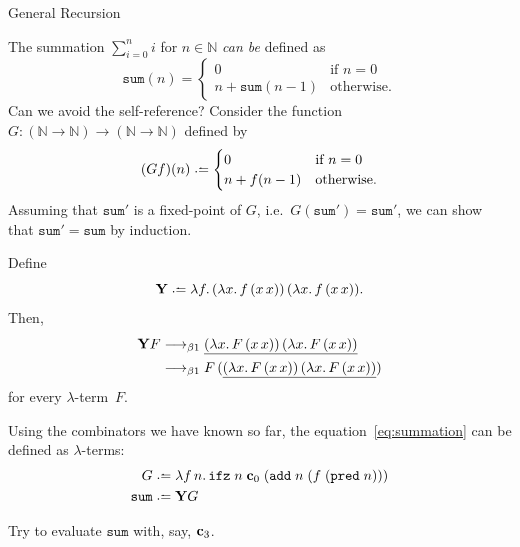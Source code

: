 \begin{frame}[allowframebreaks]{General Recursion}

  The summation $\sum_{i = 0}^{n} i$ for $n \in \mathbb{N}$ \emph{can
  be} defined as
\[
  \mathtt{sum}(n) =
    \begin{cases} 
     0 & \text{if } n = 0 \\
     n + \mathtt{sum}(n - 1)  & \text{otherwise}.
    \end{cases}
\]
Can we avoid the self-reference? Consider the function
$G\colon (\mathbb{N} \to \mathbb{N}) \to (\mathbb{N} \to \mathbb{N})$
defined by
\begin{equation} \label{eq:summation}
  (Gf)(n) \defeq
  \begin{cases}
     0 & \text{if } n = 0 \\
     n + f(n - 1)  & \text{otherwise}.
  \end{cases}
\end{equation}
Assuming that $\mathtt{sum}'$ is a fixed-point of $G$, i.e.\
$G(\mathtt{sum}') =\mathtt{sum}'$, we can show that $\mathtt{sum}' =
\mathtt{sum}$ by induction. 

\framebreak
\begin{proposition}
  Define
  \[
    \mathbf{Y} \defeq \lambda f.\, (\lambda x.\, f\,(x\,x))\,(\lambda
    x.\,f\,(x\,x)).
  \]
  Then, 
  \begin{align*}
    \mathbf{Y}F
    & \longrightarrow_{\beta1} \underline{(\lambda x.\,F\,(x\,x))\,(\lambda x.\, F\,(x\,x))} \\
    & \longrightarrow_{\beta1} F\,(\underline{(\lambda x.\,F\,(x\,x))\,(\lambda x.\,
      F\,(x\,x))})
  \end{align*}
  for every $\lambda$-term~$F$. 
\end{proposition}

\framebreak
\begin{example}
  Using the combinators we have known so far, the equation~\eqref{eq:summation}
  can be defined as $\lambda$-terms:
  \begin{align*}
    G \defeq{} & 
    \lambda f\,n.\, \mathtt{ifz}\;n\;\bc_0\;
    (\add\;n\;(f\;(\mathtt{pred}\;n))) \\
    \mathtt{sum} \defeq{} & \mathbf{Y}G
  \end{align*}
\end{example}
  Try to evaluate $\mathtt{sum}$ with, say, $\mathbf{c}_3$.

\framebreak 


\end{frame}
